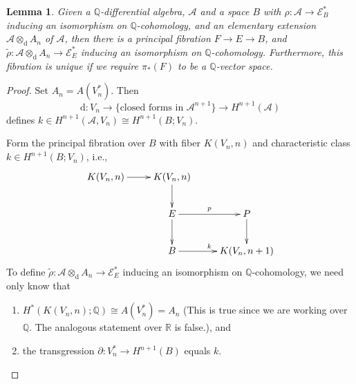 \documentclass[11pt]{amsart}
\theoremstyle{plain}
\newtheorem{lemma}[theorem]{Lemma}
\theoremstyle{definition}
\newcommand{\sA}{\mathscr{A}}
\newcommand{\sE}{\mathscr{E}}
\newcommand{\dd}{\mathrm{d}}
\newcommand{\RR}{\mathbb{R}}
\newcommand{\QQ}{\mathbb{Q}}
\begin{document}
\begin{lemma}\label{lem:3.2}
Given a $\QQ$-differential algebra, $\sA$ and a space $B$ with $\rho \colon \sA \to \sE^{*}_{B}$ inducing an isomorphism on $\QQ$-cohomology, and an elementary extension $\sA \otimes_{\dd} A_{n}$ of $\sA$, then there is a principal fibration $F \to E \to B$, and $\tilde{\rho} \colon \sA \otimes_{\dd} A_{n} \to \sE^{*}_{E}$ inducing an isomorphism on $\QQ$-cohomology. Furthermore, this fibration is unique if we require $\pi_{*}(F)$ to be a $\QQ$-vector space.
\end{lemma}

\begin{proof}
Set $A_{n} = A(V_{n}^{*})$. Then
\[
\dd \colon V_{n} \to \{\text{closed forms in } \sA^{n+1}\} \to H^{n+1}(\sA)
\]
defines $k \in H^{n+1}(\sA, V_{n}) \cong H^{n+1}(B; V_{n})$.

Form the principal fibration over $B$ with fiber $K(V_{n}, n)$ and characteristic class $k \in H^{n+1}(B; V_{n})$, i.e.,
\[
\xymatrix{
K(V_{n}, n) \ar[r] & K(V_{n}, n) \ar[d] \\
& E \ar[r]^{p} \ar[d] & P \ar[d] \\
& B \ar[r]^{k} & K(V_{n}, n+1)
}
\]
To define $\tilde{\rho} \colon \sA \otimes_{\dd} A_{n} \to \sE^{*}_{E}$ inducing an isomorphism on $\QQ$-cohomology, we need only know that
\begin{enumerate}
\item[1)] $H^{*}(K(V_{n}, n); \QQ) \cong A(V_{n}^{*}) = A_{n}$ (This is true since we are working over $\QQ$. The analogous statement over $\RR$ is false.), and
\item[2)] the transgression $\partial \colon V_{n}^{*} \to H^{n+1}(B)$ equals $k$.
\end{enumerate}
\end{proof}
\end{document}
